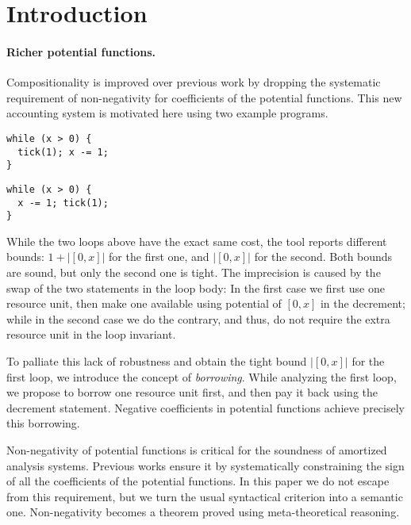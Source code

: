 \documentclass[nocopyrightspace,preprint]{sigplanconf-pldi15}
\begin{document}
\section{Introduction}

\paragraph{Richer potential functions.}
Compositionality is improved over previous work by dropping
the systematic requirement of non-negativity for coefficients
of the potential functions.
%
This new accounting system is motivated
here using two example programs.

\begin{minipage}[b]{.45\linewidth}
\begin{lstlisting}
while (x > 0) {
  tick(1); x -= 1;
}
\end{lstlisting}
\end{minipage}
\begin{minipage}[b]{.45\linewidth}
\begin{lstlisting}
while (x > 0) {
  x -= 1; tick(1);
}
\end{lstlisting}
\end{minipage}

While the two loops above have the exact same cost,
the tool \toolname{} reports different bounds: $1 +
|[0,x]|$ for the first one, and $|[0,x]|$ for the
second.  Both bounds are sound, but only the second
one is tight.
%
The imprecision is caused by the swap of the two
statements in the loop body:  In the first case
we first use one resource unit, then make one
available using potential of $[0,x]$ in the
decrement; while in the second case we do the
contrary, and thus, do not require the extra
resource unit in the loop invariant.

To palliate this lack of robustness and obtain the
tight bound $|[0,x]|$ for the first loop, we introduce
the concept of \emph{borrowing}.
While analyzing the first loop, we propose to borrow
one resource unit first, and then pay it back using
the decrement statement.  Negative coefficients in
potential functions achieve precisely this borrowing.

Non-negativity of potential functions is critical for
the soundness of amortized analysis systems.  Previous
works ensure it by systematically constraining the sign
of all the
coefficients of the potential functions.
In this paper we do not escape from this requirement,
but we turn the usual syntactical criterion into a
semantic one. Non-negativity becomes a theorem proved
using meta-theoretical reasoning.
\end{document}
